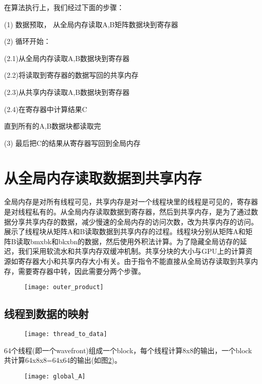 在算法执行上，我们经过下面的步骤：

(1)	数据预取， 从全局内存读取A,B矩阵数据块到寄存器

(2) 循环开始：

   (2.1)从全局内存读取A,B数据块到寄存器

   (2.2)将读取到寄存器的数据写回的共享内存

   (2.3)从共享内存读取A,B数据块到寄存器

   (2.4)在寄存器中计算结果C

直到所有的A,B数据块都读取完

(3)  最后把C的结果从寄存器写回到全局内存


\section{从全局内存读取数据到共享内存}
全局内存是对所有线程可见，共享内存是对一个线程块里的线程是可见的，寄存器是对线程私有的。从全局内存读取数据到寄存器，然后到共享内存，是为了通过数据分享共享内存的数据，减少慢速的全局内存的访问次数，改为共享内存的访问。展示了线程块从矩阵A和B读取数据到共享内存的过程。线程块分别从矩阵A和矩阵B读取bmxbk和bkxbn的数据，然后使用外积法计算。为了隐藏全局访存的延迟，我们采用软流水和共享内存双缓冲机制。共享分块的大小与GPU上的计算资源如寄存器大小和共享内存大小有关。由于指令不能直接从全局访存读取到共享内存，需要寄存器中转，因此需要分两个步骤。

\begin{figure}[htbp]
	\centering
	\texttt{[image: outer\_product]}
	\label{fig:outer_product}
\end{figure}

\subsection{线程到数据的映射}

\begin{figure}[htbp]
	\centering
	\texttt{[image: thread\_to\_data]}
	\label{fig:thread_to_data}
\end{figure}

64个线程(即一个wavefront)组成一个block，每个线程计算8x8的输出，一个block共计算64x8x8=64x64的输出(如图\ref{fig:thread_to_data})。

\begin{figure}[htbp]
	\centering
	\texttt{[image: global\_A]}
	\label{fig:global_A}
\end{figure}

